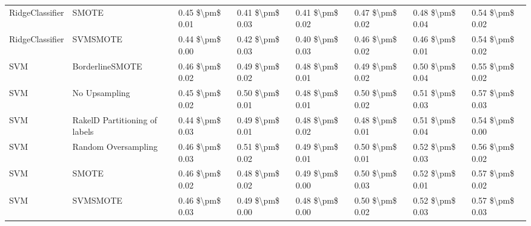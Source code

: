 \begin{tabular}{llllllll}
                RidgeClassifier &                         SMOTE & 0.45 \$\textbackslash pm\$ 0.01 &           0.41 \$\textbackslash pm\$ 0.03 &       0.41 \$\textbackslash pm\$ 0.02 &        0.47 \$\textbackslash pm\$ 0.02 &                         0.48 \$\textbackslash pm\$ 0.04 &     0.54 \$\textbackslash pm\$ 0.02 \\
                RidgeClassifier &                      SVMSMOTE & 0.44 \$\textbackslash pm\$ 0.00 &           0.42 \$\textbackslash pm\$ 0.03 &       0.40 \$\textbackslash pm\$ 0.03 &        0.46 \$\textbackslash pm\$ 0.02 &                         0.46 \$\textbackslash pm\$ 0.01 &     0.54 \$\textbackslash pm\$ 0.02 \\
                            SVM &               BorderlineSMOTE & 0.46 \$\textbackslash pm\$ 0.02 &           0.49 \$\textbackslash pm\$ 0.02 &       0.48 \$\textbackslash pm\$ 0.01 &        0.49 \$\textbackslash pm\$ 0.02 &                         0.50 \$\textbackslash pm\$ 0.04 &     0.55 \$\textbackslash pm\$ 0.02 \\
                            SVM &                 No Upsampling & 0.45 \$\textbackslash pm\$ 0.02 &           0.50 \$\textbackslash pm\$ 0.01 &       0.48 \$\textbackslash pm\$ 0.01 &        0.50 \$\textbackslash pm\$ 0.02 &                         0.51 \$\textbackslash pm\$ 0.03 &     0.57 \$\textbackslash pm\$ 0.03 \\
                            SVM & RakelD Partitioning of labels & 0.44 \$\textbackslash pm\$ 0.03 &           0.49 \$\textbackslash pm\$ 0.01 &       0.48 \$\textbackslash pm\$ 0.02 &        0.48 \$\textbackslash pm\$ 0.01 &                         0.51 \$\textbackslash pm\$ 0.04 &     0.54 \$\textbackslash pm\$ 0.00 \\
                            SVM &           Random Oversampling & 0.46 \$\textbackslash pm\$ 0.03 &           0.51 \$\textbackslash pm\$ 0.02 &       0.49 \$\textbackslash pm\$ 0.01 &        0.50 \$\textbackslash pm\$ 0.01 &                         0.52 \$\textbackslash pm\$ 0.03 &     0.56 \$\textbackslash pm\$ 0.02 \\
                            SVM &                         SMOTE & 0.46 \$\textbackslash pm\$ 0.02 &           0.48 \$\textbackslash pm\$ 0.02 &       0.49 \$\textbackslash pm\$ 0.00 &        0.50 \$\textbackslash pm\$ 0.03 &                         0.52 \$\textbackslash pm\$ 0.01 &     0.57 \$\textbackslash pm\$ 0.02 \\
                            SVM &                      SVMSMOTE & 0.46 \$\textbackslash pm\$ 0.03 &           0.49 \$\textbackslash pm\$ 0.00 &       0.48 \$\textbackslash pm\$ 0.00 &        0.50 \$\textbackslash pm\$ 0.02 &                         0.52 \$\textbackslash pm\$ 0.03 &     0.57 \$\textbackslash pm\$ 0.03 \\

\end{tabular}

